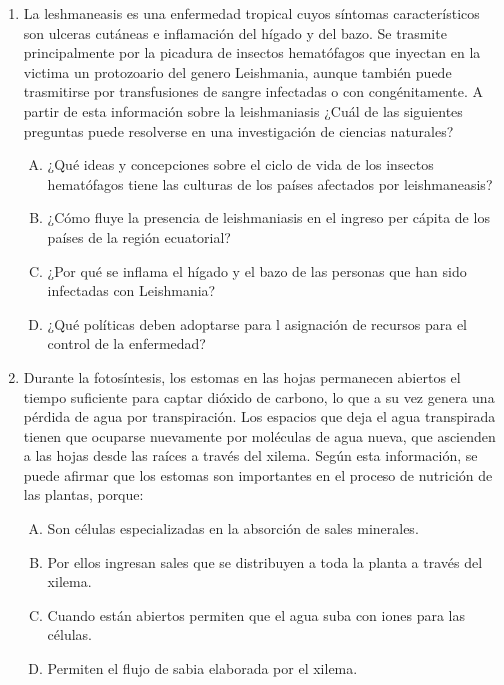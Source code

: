\begin{enumerate}
\newpage
\item La  leshmaneasis  es una  enfermedad   tropical   cuyos   síntomas     característicos   son ulceras cutáneas   e inflamación del  hígado  y del bazo.  Se  trasmite  principalmente   por la picadura   de  insectos  hematófagos    que  inyectan en la victima  un   protozoario  del  genero Leishmania, aunque también  puede trasmitirse por transfusiones   de  sangre infectadas    o con  congénitamente.  A partir  de esta información sobre la leishmaniasis  ¿Cuál de las  siguientes preguntas  puede resolverse      en una investigación de ciencias naturales?  \label{bio-23}       


\begin{enumerate}[(A)]
\item ¿Qué   ideas   y  concepciones  sobre el  ciclo de  vida de los  insectos hematófagos tiene las culturas   de los   países   afectados   por leishmaneasis?
\item ¿Cómo fluye  la presencia  de leishmaniasis   en el ingreso  per cápita  de los  países  de la región   ecuatorial?
\item ¿Por qué se inflama el hígado  y el bazo   de las personas  que han  sido infectadas con Leishmania?
\item ¿Qué políticas  deben    adoptarse    para l  asignación   de  recursos   para el control  de la enfermedad?
\end{enumerate}


\newpage
\item Durante la fotosíntesis, los estomas en las hojas permanecen abiertos  el tiempo suficiente para captar dióxido de carbono, lo que a su vez genera  una pérdida de agua por transpiración.  Los espacios que deja el agua transpirada tienen que ocuparse nuevamente  por moléculas de agua nueva, que ascienden a las hojas desde las raíces a través del xilema. Según esta información, se puede afirmar que los estomas son importantes en el proceso de nutrición de las plantas, porque: \label{bio-24}

\begin{enumerate}[(A)]
\item Son células especializadas en la absorción de sales minerales.
\item Por ellos ingresan sales que se distribuyen a toda la planta a través del xilema.
\item Cuando están abiertos permiten que el agua suba con iones para las células.
\item Permiten el flujo de sabia elaborada por el xilema.  
\end{enumerate}



\end{enumerate}
